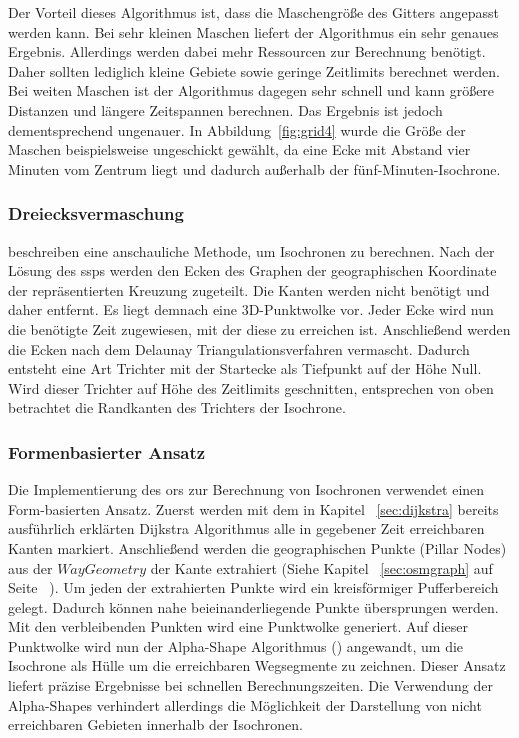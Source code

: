 Der Vorteil dieses Algorithmus ist, dass die Maschengröße des Gitters angepasst werden kann.
Bei sehr kleinen Maschen liefert der Algorithmus ein sehr genaues Ergebnis.
Allerdings werden dabei mehr Ressourcen zur Berechnung benötigt.
Daher sollten lediglich kleine Gebiete sowie geringe Zeitlimits berechnet werden.
Bei weiten Maschen ist der Algorithmus dagegen sehr schnell und kann größere Distanzen und längere Zeitspannen berechnen.
Das Ergebnis ist jedoch dementsprechend ungenauer.
In Abbildung~\ref{fig:grid4} wurde die Größe der Maschen beispielsweise ungeschickt gewählt, da eine Ecke mit Abstand vier Minuten vom Zentrum liegt und dadurch außerhalb der fünf-Minuten-Isochrone.

\subsubsection{Dreiecksvermaschung}
\cite{isochrones} beschreiben eine anschauliche Methode, um Isochronen zu berechnen.
Nach der Lösung des \gls{ssp}s werden den Ecken des Graphen der geographischen Koordinate der repräsentierten Kreuzung zugeteilt.
Die Kanten werden nicht benötigt und daher entfernt.
Es liegt demnach eine 3D-Punktwolke vor.
Jeder Ecke wird nun die benötigte Zeit zugewiesen, mit der diese zu erreichen ist.
Anschließend werden die Ecken nach dem Delaunay Triangulationsverfahren vermascht.
Dadurch entsteht eine Art Trichter mit der Startecke als Tiefpunkt auf der Höhe Null.
Wird dieser Trichter auf Höhe des Zeitlimits geschnitten, entsprechen von oben betrachtet die Randkanten des Trichters der Isochrone.


\subsubsection{Formenbasierter Ansatz}
\label{sec:form}
Die Implementierung des \gls{ors} zur Berechnung von Isochronen verwendet einen Form-basierten Ansatz.
Zuerst werden mit dem in Kapitel ~\ref{sec:dijkstra} bereits ausführlich erklärten Dijkstra Algorithmus alle in gegebener Zeit erreichbaren Kanten markiert.
Anschließend werden die geographischen Punkte (Pillar Nodes) aus der $WayGeometry$ der Kante extrahiert (Siehe Kapitel ~\ref{sec:osmgraph} auf Seite ~\pageref{sec:osmgraph}).
Um jeden der extrahierten Punkte wird ein kreisförmiger Pufferbereich gelegt.
Dadurch können nahe beieinanderliegende Punkte übersprungen werden.
Mit den verbleibenden Punkten wird eine Punktwolke generiert.
Auf dieser Punktwolke wird nun der Alpha-Shape Algorithmus (\cite{akkiraju1995alpha}) angewandt, um die Isochrone als Hülle um die erreichbaren Wegsegmente zu zeichnen.
Dieser Ansatz liefert präzise Ergebnisse bei schnellen Berechnungszeiten.
Die Verwendung der Alpha-Shapes verhindert allerdings die Möglichkeit der Darstellung von nicht erreichbaren Gebieten innerhalb der Isochronen.
